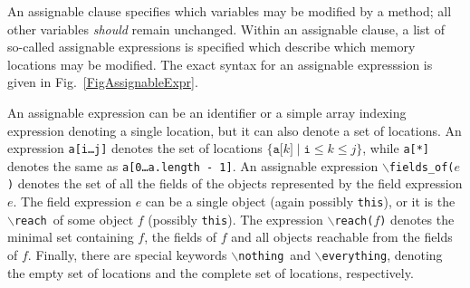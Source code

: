 \documentclass[a4paper]{llncs}
\newcommand{\jml}{\textsc{Jml}}
\newcommand{\java}{\textsc{Java}}
\newcommand{\fieldsofarg}[1]{\texttt{\(\backslash\)fields\_of(#1)}}
\newcommand{\reach}{\texttt{\(\backslash\)reach}}
\newcommand{\reacharg}[1]{\texttt{\(\backslash\)reach(#1)}}
\newcommand{\nothing}{\texttt{\(\backslash\)nothing}}
\newcommand{\everything}{\texttt{\(\backslash\)everything}}
\begin{document}
An assignable clause specifies which variables may 
be modified by a method; all other variables \emph{should} remain
unchanged. Within an assignable clause, a list of so-called assignable 
expressions is specified which describe which memory locations may be
modified. The exact syntax for an assignable
expresssion is given in Fig.~\ref{FigAssignableExpr}.


An assignable expression can be an identifier or a simple array
indexing expression denoting a single location, but it can also denote
a set of locations. An expression
\texttt{a[i\dots j]} denotes the set of locations
\(\{\texttt{a[}k\texttt{]}\mid \texttt{i} \leq k \leq j\}\), while
\texttt{a[*]} denotes the same as \texttt{a[0\dots a.length - 1]}.
An assignable expression \fieldsofarg{\(e\)} denotes the set of all
the fields of the objects represented by the field expression \(e\).
The field expression \(e\) can be a single object (again possibly
\texttt{this}), or it is the \reach\ of some object \(f\) (possibly
\texttt{this}). The expression \reacharg{\(f\)} denotes the minimal 
set containing \(f\), the fields of \(f\) and all objects reachable
from the fields of \(f\).  Finally, there are special keywords
\nothing\ and \everything, denoting the empty set of locations and the 
complete set of locations, respectively.

\end{document}
